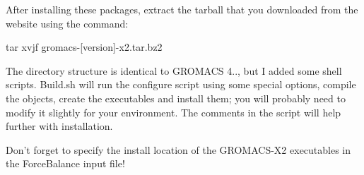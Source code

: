 After installing these packages, extract the tarball that you downloaded from the website using the command\-:

\begin{DoxyVerb}tar xvjf gromacs-[version]-x2.tar.bz2 \end{DoxyVerb}


The directory structure is identical to G\-R\-O\-M\-A\-C\-S 4.., but I added some shell scripts. {\ttfamily Build.\-sh} will run the configure script using some special options, compile the objects, create the executables and install them; you will probably need to modify it slightly for your environment. The comments in the script will help further with installation.

Don't forget to specify the install location of the G\-R\-O\-M\-A\-C\-S-\/\-X2 executables in the Force\-Balance input file! 